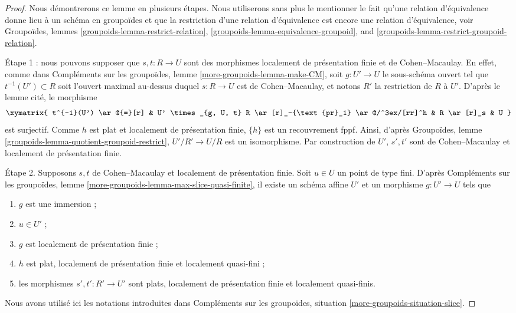 \begin{proof}
Nous démontrerons ce lemme en plusieurs étapes. Nous utiliserons sans plus
le mentionner le fait qu'une relation d'équivalence donne lieu à un schéma en
groupoïdes et que la restriction d'une relation d'équivalence est encore une relation
d'équivalence, voir
Groupoïdes, lemmes
\ref{groupoids-lemma-restrict-relation},
\ref{groupoids-lemma-equivalence-groupoid}, and
\ref{groupoids-lemma-restrict-groupoid-relation}.

\medskip\noindent
Étape 1 : nous pouvons supposer que $s, t : R \to U$ sont des morphismes
localement de présentation finie et de Cohen--Macaulay. En effet, comme dans
Compléments sur les groupoïdes, lemme \ref{more-groupoids-lemma-make-CM},
soit $g : U' \to U$ le sous-schéma ouvert tel que
$t^{-1}(U') \subset R$ soit l'ouvert maximal au-dessus duquel $s : R \to U$ est
de Cohen--Macaulay, et notons $R'$ la restriction de $R$ à $U'$.
D'après le lemme cité, le morphisme
$$
\xymatrix{
t^{-1}(U') \ar@{=}[r] &
U' \times_{g, U, t} R \ar[r]_-{\text{pr}_1} \ar@/^3ex/[rr]^h &
R \ar[r]_s &
U
}
$$
est surjectif. Comme $h$ est plat et localement de présentation finie,
$\{h\}$ est un recouvrement fppf. Ainsi, d'après
Groupoïdes, lemme \ref{groupoids-lemma-quotient-groupoid-restrict},
$U'/R' \to U/R$ est un isomorphisme. Par construction de $U'$,
$s', t'$ sont de Cohen--Macaulay et localement de présentation finie.

\medskip\noindent
Étape 2. Supposons $s, t$ de Cohen--Macaulay et localement de présentation finie.
Soit $u \in U$ un point de type fini. D'après
Compléments sur les groupoïdes, lemme \ref{more-groupoids-lemma-max-slice-quasi-finite},
il existe un schéma affine $U'$ et un morphisme $g : U' \to U$ tels que
\begin{enumerate}
\item $g$ est une immersion ;
\item $u \in U'$ ;
\item $g$ est localement de présentation finie ;
\item $h$ est plat, localement de présentation finie et localement quasi-fini ;
\item les morphismes $s', t' : R' \to U'$ sont plats, localement de
présentation finie et localement quasi-finis.
\end{enumerate}
Nous avons utilisé ici les notations introduites dans
Compléments sur les groupoïdes, situation \ref{more-groupoids-situation-slice}.


\end{proof}
